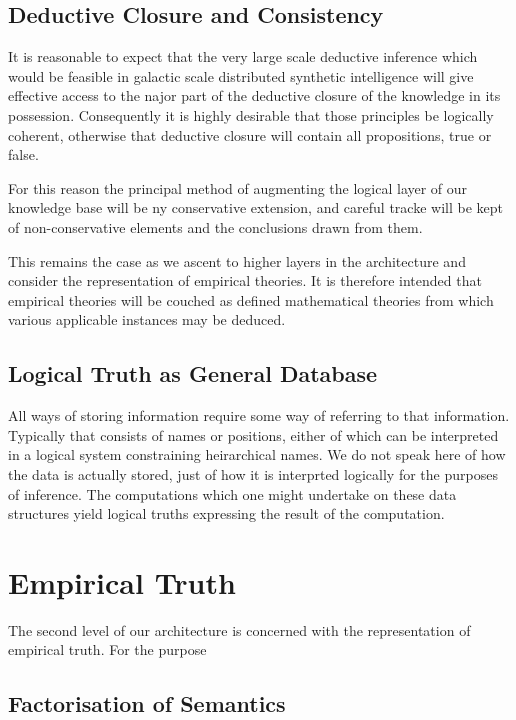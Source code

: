 \documentclass[10pt,titlepage]{article}
\begin{document}
\subsection{Deductive Closure and Consistency}

It is reasonable to expect that the very large scale deductive inference which would be feasible in galactic scale distributed synthetic intelligence will give effective access to the najor part of the deductive closure of the knowledge in its possession.
Consequently it is highly desirable that those principles be logically coherent, otherwise that deductive closure will contain all propositions, true or false.

For this reason the principal method of augmenting the logical layer of our knowledge base will be ny conservative extension, and careful tracke will be kept of non-conservative elements and the conclusions drawn from them.

This remains the case as we ascent to higher layers in the architecture and consider the representation of empirical theories.
It is therefore intended that empirical theories will be couched as defined mathematical theories from which various applicable instances may be deduced.

\subsection{Logical Truth as General Database}

All ways of storing information require some way of referring to that information.
Typically that consists of names or positions, either of which can be interpreted in a logical system constraining heirarchical names.
We do not speak here of how the data is actually stored, just of how it is interprted logically for the purposes of inference.
The computations which one might undertake on these data structures yield logical truths expressing the result of the computation.


\section{Empirical Truth}

The second level of our architecture is concerned with the representation of empirical truth.
For the purpose


\subsection{Factorisation of Semantics}
\end{document}
